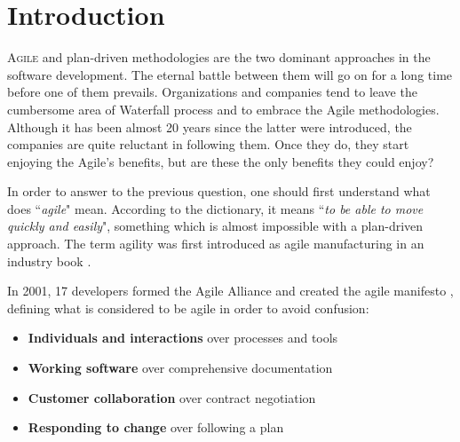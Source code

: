 \chapter{Introduction}
\label{ch:introduction}

\lettrine[lines=4, loversize=-0.1, lraise=0.1]{A}{gile} and plan-driven methodologies are the two dominant approaches in the software development. The eternal battle between them will go on for a long time before one of them prevails. Organizations and companies tend to leave the cumbersome area of Waterfall process and to embrace the Agile methodologies. Although it has been almost 20 years since the latter were introduced, the companies are quite reluctant in following them. Once they do, they start enjoying the Agile's benefits, but are these the only benefits they could enjoy?

In order to answer to the previous question, one should first understand what does ``\textit{agile}" mean. According to the dictionary, it means ``\textit{to be able to move quickly and easily}", something which is almost impossible with a plan-driven approach. The term agility was first introduced as agile manufacturing in an industry book \cite{agile_manufacturing}.

In 2001, 17 developers formed the Agile Alliance and created the agile manifesto \cite{beck2001agile}, defining what is considered to be agile in order to avoid confusion: 
\begin{itemize}
	\item {\large \textbf{Individuals and interactions}} over processes and tools
	\item {\large \textbf{Working software}} over comprehensive documentation
	\item {\large \textbf{Customer collaboration}} over contract negotiation
	\item {\large \textbf{Responding to change}} over following a plan
\end{itemize}

